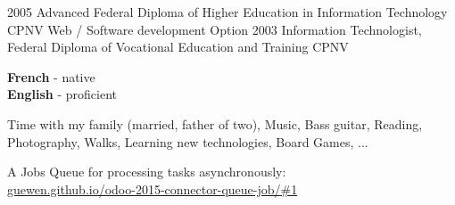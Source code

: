 \documentclass[9pt]{developercv} %
\begin{document}
\begin{entrylist}
	\entry
		{2005}
		{Advanced Federal Diploma of Higher Education in Information Technology}
		{CPNV}
		{Web / Software development Option}
	\entry
		{2003}
		{Information Technologist, Federal Diploma of Vocational Education and Training}
		{CPNV}
		{}
\end{entrylist}


\begin{minipage}[t]{0.3\textwidth}
	\vspace{-\baselineskip} %

	
	\textbf{French} - native\\
	\textbf{English} - proficient\\
\end{minipage}
\hfill
\begin{minipage}[t]{0.3\textwidth}
	\vspace{-\baselineskip} %
	
	
  Time with my family (married, father of two), Music, Bass guitar, Reading, 
  Photography, Walks, Learning new technologies, Board Games, ...
\end{minipage}
\hfill
\begin{minipage}[t]{0.3\textwidth}
	\vspace{-\baselineskip} %
	

  {A Jobs Queue for processing tasks asynchronously}:\\
  {\href{https://guewen.github.io/odoo-2015-connector-queue-job/#1}{guewen.github.io/odoo-2015-connector-queue-job/\#1}}

\end{minipage}

\end{document}

